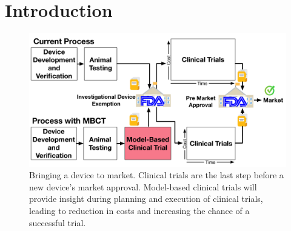 \section{Introduction}%
\label{sec:intro}
	\begin{figure}[t]
		\centering
		\vspace{-10pt}
		\includegraphics[scale=0.25]{figures/figTransResearchSpectrum.pdf}
		\vspace{-10pt}
		\caption{\small Bringing a device to market.
			Clinical trials are the last step before a new device's market approval.
			Model-based clinical trials will provide insight during planning and execution of clinical trials, leading to reduction in costs and increasing the chance of a successful trial.}
		\vspace{-10pt}
		\label{fig:spectrum}
	\end{figure}
	
